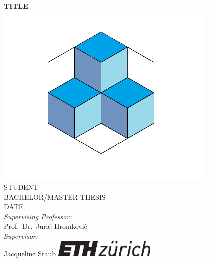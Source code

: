 \documentclass[a4paper,twoside,12pt,nochapterprefix]{scrbook}
\begin{document}
%


\newcommand{\mfytext}[0]{my fancy text}

\newcommand{\chpref}[1]{Chapter \ref{#1}}
\newcommand{\secref}[1]{Section \ref{#1}}
\newcommand{\figref}[1]{Figure \ref{#1}}
\newcommand{\tabref}[1]{Table \ref{#1}}
\newcommand{\apxref}[1]{Appendix \ref{#1}}

%
\begin{titlepage}
	\topmargin 0.5cm
	\oddsidemargin 0.0cm
	\evensidemargin 0.0cm
	\centering
	\Huge
	\vspace{1.0cm}
	\textbf{\textsf{TITLE}} \\[1.0cm]
	\includegraphics*[width=0.8\textwidth]{figures/teaser} \\ %
	\vspace{1cm}
	\sffamily
	\Large
	STUDENT
	\\[0.8cm]
	\large
	BACHELOR/MASTER THESIS
	\\
	DATE
	\\[1.3cm]
	\emph{Supervising Professor:}\\
	Prof.\ Dr.\ Juraj Hromkovi\v c		%
	\\[0.8cm]
	\emph{Supervisor:}\\
	Jacqueline Staub
	\vfill
	\includegraphics*[height=0.8cm]{figures/eth_logo_kurz_pos.eps} \hfill
	\vspace{3.4cm}
\end{titlepage}
\clearemptydoublepage
\end{document}
